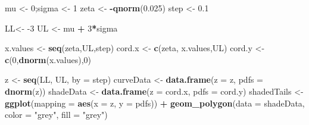 \documentclass[
]{book}
\newenvironment{Shaded}{\begin{snugshade}}{\end{snugshade}}
\newcommand{\DataTypeTok}[1]{\textcolor[rgb]{0.13,0.29,0.53}{#1}}
\newcommand{\DecValTok}[1]{\textcolor[rgb]{0.00,0.00,0.81}{#1}}
\newcommand{\FloatTok}[1]{\textcolor[rgb]{0.00,0.00,0.81}{#1}}
\newcommand{\KeywordTok}[1]{\textcolor[rgb]{0.13,0.29,0.53}{\textbf{#1}}}
\newcommand{\NormalTok}[1]{#1}
\newcommand{\OperatorTok}[1]{\textcolor[rgb]{0.81,0.36,0.00}{\textbf{#1}}}
\newcommand{\StringTok}[1]{\textcolor[rgb]{0.31,0.60,0.02}{#1}}
\begin{document}
\begin{Shaded}
\begin{Highlighting}[]
\NormalTok{mu \textless{}{-}}\StringTok{ }\DecValTok{0}\NormalTok{;sigma \textless{}{-}}\StringTok{ }\DecValTok{1}
\NormalTok{zeta \textless{}{-}}\StringTok{ }\OperatorTok{{-}}\KeywordTok{qnorm}\NormalTok{(}\FloatTok{0.025}\NormalTok{)}
\NormalTok{step \textless{}{-}}\StringTok{ }\FloatTok{0.1}

\NormalTok{LL\textless{}{-}}\StringTok{ }\DecValTok{{-}3}
\NormalTok{UL \textless{}{-}}\StringTok{ }\NormalTok{mu }\OperatorTok{+}\StringTok{ }\DecValTok{3}\OperatorTok{*}\NormalTok{sigma}

\NormalTok{x.values \textless{}{-}}\StringTok{ }\KeywordTok{seq}\NormalTok{(zeta,UL,step)}
\NormalTok{cord.x \textless{}{-}}\StringTok{ }\KeywordTok{c}\NormalTok{(zeta, x.values,UL) }
\NormalTok{cord.y \textless{}{-}}\StringTok{ }\KeywordTok{c}\NormalTok{(}\DecValTok{0}\NormalTok{,}\KeywordTok{dnorm}\NormalTok{(x.values),}\DecValTok{0}\NormalTok{) }

\NormalTok{z \textless{}{-}}\StringTok{ }\KeywordTok{seq}\NormalTok{(LL, UL, }\DataTypeTok{by =}\NormalTok{ step)}
\NormalTok{curveData \textless{}{-}}\StringTok{ }\KeywordTok{data.frame}\NormalTok{(}\DataTypeTok{z =}\NormalTok{ z, }\DataTypeTok{pdfs =} \KeywordTok{dnorm}\NormalTok{(z))}
\NormalTok{shadeData \textless{}{-}}\StringTok{ }\KeywordTok{data.frame}\NormalTok{(}\DataTypeTok{z =}\NormalTok{ cord.x, }\DataTypeTok{pdfs =}\NormalTok{ cord.y)}
\NormalTok{shadedTails \textless{}{-}}\StringTok{ }\KeywordTok{ggplot}\NormalTok{(}\DataTypeTok{mapping =} \KeywordTok{aes}\NormalTok{(}\DataTypeTok{x =}\NormalTok{ z, }\DataTypeTok{y =}\NormalTok{ pdfs))  }\OperatorTok{+}\StringTok{ }\KeywordTok{geom\_polygon}\NormalTok{(}\DataTypeTok{data =}\NormalTok{ shadeData, }\DataTypeTok{color =} \StringTok{"grey"}\NormalTok{, }\DataTypeTok{fill =} \StringTok{"grey"}\NormalTok{)}


\end{Highlighting}
\end{Shaded}
\end{document}
